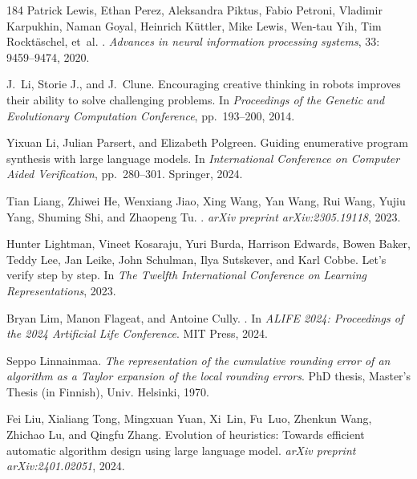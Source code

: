 \begin{thebibliography}{184}
Patrick Lewis, Ethan Perez, Aleksandra Piktus, Fabio Petroni, Vladimir
  Karpukhin, Naman Goyal, Heinrich K{\"u}ttler, Mike Lewis, Wen-tau Yih, Tim
  Rockt{\"a}schel, et~al.
.
\newblock \emph{Advances in neural information processing systems},
  33: 9459--9474, 2020.

J.~Li, Storie J., and J.~Clune.
\newblock Encouraging creative thinking in robots improves their ability to
  solve challenging problems.
\newblock In \emph{Proceedings of the Genetic and Evolutionary Computation
  Conference}, pp.\  193--200, 2014.

Yixuan Li, Julian Parsert, and Elizabeth Polgreen.
\newblock Guiding enumerative program synthesis with large language models.
\newblock In \emph{International Conference on Computer Aided Verification},
  pp.\  280--301. Springer, 2024.

Tian Liang, Zhiwei He, Wenxiang Jiao, Xing Wang, Yan Wang, Rui Wang, Yujiu
  Yang, Shuming Shi, and Zhaopeng Tu.
.
\newblock \emph{arXiv preprint arXiv:2305.19118}, 2023.

Hunter Lightman, Vineet Kosaraju, Yuri Burda, Harrison Edwards, Bowen Baker,
  Teddy Lee, Jan Leike, John Schulman, Ilya Sutskever, and Karl Cobbe.
\newblock Let's verify step by step.
\newblock In \emph{The Twelfth International Conference on Learning
  Representations}, 2023.

Bryan Lim, Manon Flageat, and Antoine Cully.
.
\newblock In \emph{ALIFE 2024: Proceedings of the 2024 Artificial Life
  Conference}. MIT Press, 2024.

Seppo Linnainmaa.
\newblock \emph{The representation of the cumulative rounding error of an
  algorithm as a Taylor expansion of the local rounding errors}.
\newblock PhD thesis, Master’s Thesis (in Finnish), Univ. Helsinki, 1970.

Fei Liu, Xialiang Tong, Mingxuan Yuan, Xi~Lin, Fu~Luo, Zhenkun Wang, Zhichao
  Lu, and Qingfu Zhang.
\newblock Evolution of heuristics: Towards efficient automatic algorithm design
  using large language model.
\newblock \emph{arXiv preprint arXiv:2401.02051}, 2024.


\end{thebibliography}
